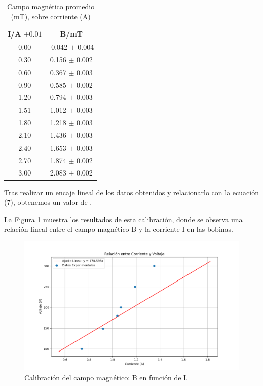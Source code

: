 \documentclass[twocolumn,a4paper,11pt]{scrartcl}
\begin{document}
\begin{table}[h!]
\centering
\begin{tabular}{ |c| c | } 
\hline
I/A $\pm0.01$ & B/mT \\ 
\hline
0.00 & -0.042 $\pm$ 0.004 \\ 
0.30 & 0.156 $\pm$ 0.002 \\ 
0.60 & 0.367 $\pm$ 0.003 \\ 
0.90 & 0.585 $\pm$ 0.002 \\ 
1.20 & 0.794 $\pm$ 0.003 \\ 
1.51 & 1.012 $\pm$ 0.003 \\ 
1.80 & 1.218 $\pm$ 0.003 \\ 
2.10 & 1.436 $\pm$ 0.003 \\ 
2.40 & 1.653 $\pm$ 0.003 \\ 
2.70 & 1.874 $\pm$ 0.002 \\ 
3.00 & 2.083 $\pm$ 0.002 \\ 
\hline
\end{tabular}
\caption{Campo magnético promedio (mT), sobre corriente (A)}
\label{tabla:AT}
\end{table}


Tras realizar un encaje lineal de los datos obtenidos y relacionarlo con la ecuación (7), obtenemos un valor de .



La Figura \ref{fig:B_vs_I} muestra los resultados de esta calibración, donde se observa una relación lineal entre el campo magnético B y la corriente I en las bobinas.

\begin{figure}[h]
    \centering
    \includegraphics[width=1\linewidth]{voltaje_vs_corriente.png}
    \caption{Calibración del campo magnético: B en función de I.}
    \label{fig:B_vs_I}
\end{figure}
\end{document}
